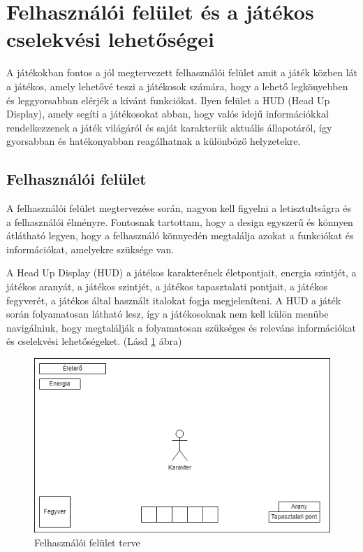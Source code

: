 \section{Felhasználói felület és a játékos cselekvési lehetőségei}

\indent \indent A játékokban fontos a jól megtervezett felhasználói felület amit a játék közben lát a játékos, amely lehetővé teszi a játékosok számára, hogy a lehető legkönyebben és leggyorsabban elérjék a kívánt funkciókat. Ilyen felület a HUD (Head Up Display), amely segíti a játékosokat abban, hogy valós idejű információkkal rendelkezzenek a játék világáról és saját karakterük aktuális állapotáról, így gyorsabban és hatékonyabban reagálhatnak a különböző helyzetekre.


\subsection{Felhasználói felület}

\indent \indent A felhasználói felület megtervezése során, nagyon kell figyelni a letisztultságra és a felhasználói élményre. Fontosnak tartottam, hogy a design egyszerű és könnyen átlátható legyen, hogy a felhasználó könnyedén megtalálja azokat a funkciókat és információkat, amelyekre szüksége van.

A Head Up Display (HUD) a játékos karakterének életpontjait, energia szintjét, a játékos aranyát, a játékos szintjét, a játékos tapasztalati pontjait, a játékos fegyverét, a játékos által használt italokat fogja megjeleníteni.
A HUD a játék során folyamatosan látható lesz, így a játékosoknak nem kell külön menübe navigálniuk, hogy megtalálják a folyamatosan szükséges és releváns információkat és cselekvési lehetőségeket. (Lásd \ref{fig:Felhasználói felület} ábra)

\begin{figure}[H]
    \centering
    \includegraphics[width=14.0truecm]{images/MS_UI.drawio.png}
    \caption{Felhasználói felület terve}
    \label{fig:Felhasználói felület}
\end{figure}

